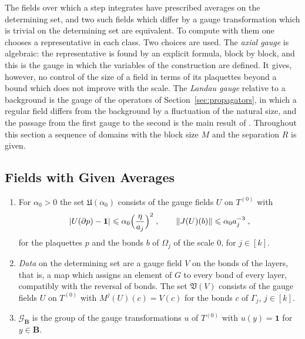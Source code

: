 \documentclass[11pt]{preprint}
\newcommand{\id}{\mathbf 1}
\DeclarePairedDelimiter{\abs}{\lvert}{\rvert}
\DeclarePairedDelimiter{\norm}{\lVert}{\rVert}
\numberwithin{equation}{section}
\begin{document}
The fields over which a step integrates have prescribed averages on the determining set, and two such fields which differ by a gauge transformation which is trivial on the determining set are equivalent. To compute with them one chooses a representative in each class. Two choices are used. The \emph{axial gauge} is algebraic: the representative is found by an explicit formula, block by block, and this is the gauge in which the variables of the construction are defined. It gives, however, no control of the size of a field in terms of its plaquettes beyond a bound which does not improve with the scale. The \emph{Landau gauge} relative to a background is the gauge of the operators of Section~\ref{sec:propagators}, in which a regular field differs from the background by a fluctuation of the natural size, and the passage from the first gauge to the second is the main result of \cite{BalabanREG}. Throughout this section a sequence of domains with the block size $M$ and the separation $R$ is given.

\subsection{Fields with Given Averages}\label{sec:regular-fields}

\begin{definition}\label{def:regular-fields}
\begin{enumerate}[label=(\roman*)]
\item For $\alpha_0 > 0$ the set $\mathfrak U(\alpha_0)$ consists of the gauge fields $U$ on $T^{(0)}$ with
\begin{equation}\label{eq:plaquette-regular}
    \abs{U(\partial p) - \id} \leqslant \alpha_0\Bigl(\frac{\eta}{a_j}\Bigr)^2\;,
    \qquad
    \norm{J(U)(b)} \leqslant \alpha_0a_j^{-3}\;,
\end{equation}
for the plaquettes $p$ and the bonds $b$ of $\Omega_j$ of the scale $0$, for $j \in [k]$.
\item \emph{Data} on the determining set are a gauge field $V$ on the bonds of the layers, that is, a map which assigns an element of $G$ to every bond of every layer, compatibly with the reversal of bonds. The set $\mathfrak V(V)$ consists of the gauge fields $U$ on $T^{(0)}$ with $M^j(U)(c) = V(c)$ for the bonds $c$ of $\Gamma_j$, $j \in [k]$.
\item $\mathcal G_{\mathbf B}$ is the group of the gauge transformations $u$ of $T^{(0)}$ with $u(y) = \id$ for $y \in \mathbf B$.
\end{enumerate}
\end{definition}
\end{document}
